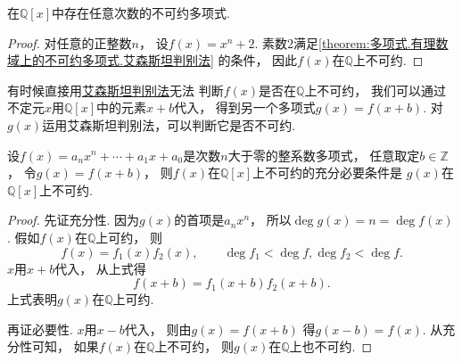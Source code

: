 \begin{corollary}
在\(\mathbb{Q}[x]\)中存在任意次数的不可约多项式.
\begin{proof}
对任意的正整数\(n\)，
设\(f(x)=x^n+2\).
素数\(2\)满足\cref{theorem:多项式.有理数域上的不可约多项式.艾森斯坦判别法} 的条件，
因此\(f(x)\)在\(\mathbb{Q}\)上不可约.
\end{proof}
\end{corollary}

有时候直接用\hyperref[theorem:多项式.有理数域上的不可约多项式.艾森斯坦判别法]{艾森斯坦判别法}无法
判断\(f(x)\)是否在\(\mathbb{Q}\)上不可约，
我们可以通过不定元\(x\)用\(\mathbb{Q}[x]\)中的元素\(x+b\)代入，
得到另一个多项式\(g(x)=f(x+b)\).
对\(g(x)\)运用艾森斯坦判别法，可以判断它是否不可约.
\begin{proposition}\label{theorem:多项式.有理数域上的不可约多项式.一次代入同不可约}
设\(f(x)=a_n x^n+\dotsb+a_1 x+a_0\)是次数\(n\)大于零的整系数多项式，
任意取定\(b\in\mathbb{Z}\)，
令\(g(x)=f(x+b)\)，
则\(f(x)\)在\(\mathbb{Q}[x]\)上不可约的充分必要条件是
\(g(x)\)在\(\mathbb{Q}[x]\)上不可约.
\begin{proof}
先证充分性.
因为\(g(x)\)的首项是\(a_n x^n\)，
所以\(\deg g(x)=n=\deg f(x)\).
假如\(f(x)\)在\(\mathbb{Q}\)上可约，
则\begin{equation*}
	f(x)=f_1(x) f_2(x), \qquad
	\deg f_1 < \deg f,
	\deg f_2 < \deg f.
\end{equation*}
\(x\)用\(x+b\)代入，
从上式得\begin{equation*}
	f(x+b)=f_1(x+b) f_2(x+b).
\end{equation*}
上式表明\(g(x)\)在\(\mathbb{Q}\)上可约.

再证必要性.
\(x\)用\(x-b\)代入，
则由\(g(x)=f(x+b)\)
得\(g(x-b)=f(x)\).
从充分性可知，
如果\(f(x)\)在\(\mathbb{Q}\)上不可约，
则\(g(x)\)在\(\mathbb{Q}\)上也不可约.
\end{proof}
\end{proposition}

